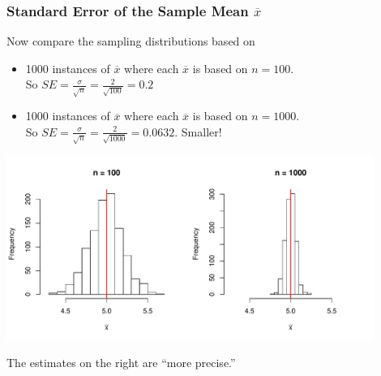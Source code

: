 \documentclass[handout]{beamer}
\newcommand{\blue}[1]{\textcolor{blue2}{#1}}
\newcommand{\xbar}{\overline{x}}
\begin{document}
%
\begin{frame}[fragile]
\frametitle{Standard Error of the Sample Mean $\xbar$}
Now compare the sampling distributions based on
\begin{itemize}
\pause \item 1000 instances of $\xbar$ where each $\xbar$ is based on $n=100$.\\
So $SE = \frac{\sigma}{\sqrt{n}} = \frac{2}{\sqrt{100}} = 0.2$
\pause \item 1000 instances of $\xbar$ where each $\xbar$ is based on $n=1000$.\\
So $SE = \frac{\sigma}{\sqrt{n}} = \frac{2}{\sqrt{1000}} = 0.0632$.  \blue{Smaller}!
\end{itemize}

\begin{center}
\pause \includegraphics[width=0.9\textwidth]{figure/compare}
\end{center}
\pause The estimates on the right are ``more precise.''

\end{frame}
\end{document}
